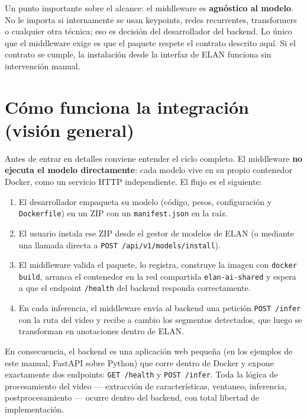 \documentclass[12pt,a4paper]{article}
\begin{document}
Un punto importante sobre el alcance: el middleware es \textbf{agnóstico al modelo}. No le importa si internamente se usan keypoints, redes recurrentes, transformers o cualquier otra técnica; eso es decisión del desarrollador del backend. Lo único que el middleware exige es que el paquete respete el contrato descrito aquí. Si el contrato se cumple, la instalación desde la interfaz de ELAN funciona sin intervención manual.

\section{Cómo funciona la integración (visión general)}

Antes de entrar en detalles conviene entender el ciclo completo. El middleware \textbf{no ejecuta el modelo directamente}: cada modelo vive en su propio contenedor Docker, como un servicio HTTP independiente. El flujo es el siguiente:

\begin{enumerate}[noitemsep, topsep=2pt]
    \item El desarrollador empaqueta su modelo (código, pesos, configuración y \texttt{Dockerfile}) en un ZIP con un \texttt{manifest.json} en la raíz.
    \item El usuario instala ese ZIP desde el gestor de modelos de ELAN (o mediante una llamada directa a \texttt{POST /api/v1/models/install}).
    \item El middleware valida el paquete, lo registra, construye la imagen con \texttt{docker build}, arranca el contenedor en la red compartida \texttt{elan-ai-shared} y espera a que el endpoint \texttt{/health} del backend responda correctamente.
    \item En cada inferencia, el middleware envía al backend una petición \texttt{POST /infer} con la ruta del video y recibe a cambio los segmentos detectados, que luego se transforman en anotaciones dentro de ELAN.
\end{enumerate}

En consecuencia, el backend es una aplicación web pequeña (en los ejemplos de este manual, FastAPI sobre Python) que corre dentro de Docker y expone exactamente dos endpoints: \texttt{GET /health} y \texttt{POST /infer}. Toda la lógica de procesamiento del video --- extracción de características, ventaneo, inferencia, postprocesamiento --- ocurre dentro del backend, con total libertad de implementación.
\end{document}
